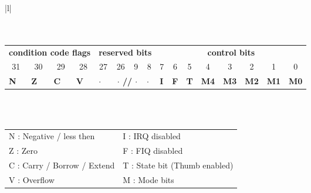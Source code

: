 \begin{center}
\begin{tabular}{|l|}
\hline
\\
\\
\\
	\begin{tabular}{|*{16}{p{0.5cm}|}}
	\multicolumn{4}{c}{\textbf{\small condition code flags}} & \multicolumn{4}{c}{\textbf{\small reserved bits}} & \multicolumn{8}{c}{\textbf{\small control bits}} \\
	\multicolumn{1}{c}{31} & \multicolumn{1}{c}{30} & \multicolumn{1}{c}{29} & \multicolumn{1}{c}{28} & \multicolumn{1}{c}{27} & \multicolumn{1}{c}{26} & \multicolumn{1}{c}{9} & \multicolumn{1}{c}{8} & \multicolumn{1}{c}{7} & \multicolumn{1}{c}{6} & \multicolumn{1}{c}{5} & \multicolumn{1}{c}{4} & \multicolumn{1}{c}{3} & \multicolumn{1}{c}{2} & \multicolumn{1}{c}{1} & \multicolumn{1}{c}{0} \\
	\hline
	\textbf{N} & \textbf{Z} & \textbf{C} & \textbf{V} & \textbf{$\cdot$} & \multicolumn{2}{c|}{\textbf{$\cdot$ // $\cdot$}} & \textbf{$\cdot$} & \textbf{I} & \textbf{F} & \textbf{T} & \textbf{M4} & \textbf{M3} & \textbf{M2} & \textbf{M1} & \textbf{M0} \\
	\hline
	\end{tabular} \\
	\\
	\begin{tabular}{ll}
	N : Negative / less then & I : IRQ disabled \\
	Z : Zero & F : FIQ disabled \\
	C : Carry / Borrow / Extend & T : State bit (Thumb enabled)\\
	V : Overflow & M : Mode bits \\
	\end{tabular} \\
\\
\hline
\end{tabular}
\end{center}
